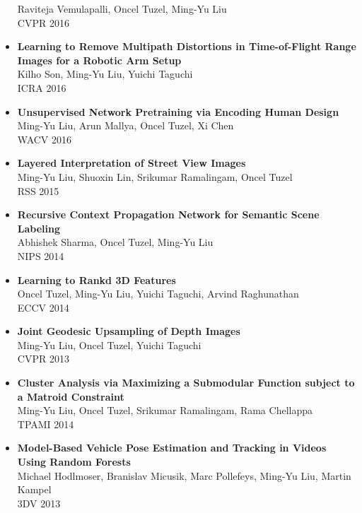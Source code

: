 \begin{itemize}
      Raviteja Vemulapalli, Oncel Tuzel, Ming-Yu Liu\\ CVPR 2016\vspace{-2mm}
\item {\bf Learning to Remove Multipath Distortions in Time-of-Flight Range Images for a Robotic Arm Setup}\\
      Kilho Son, Ming-Yu Liu, Yuichi Taguchi\\
       ICRA 2016\vspace{-2mm}
\item {\bf Unsupervised Network Pretraining via Encoding Human Design}\\
      Ming-Yu Liu, Arun Mallya, Oncel Tuzel, Xi Chen\\ WACV 2016\vspace{-2mm}
\item {\bf Layered Interpretation of Street View Images}\\
      Ming-Yu Liu, Shuoxin Lin, Srikumar Ramalingam, Oncel Tuzel\\
      RSS 2015\vspace{-2mm}
\item {\bf Recursive Context Propagation Network for Semantic Scene Labeling}\\
			Abhishek Sharma, Oncel Tuzel, Ming-Yu Liu\\ NIPS 2014\vspace{-2mm}
\item {\bf Learning to Rankd 3D Features}\\
			Oncel Tuzel, Ming-Yu Liu, Yuichi Taguchi, Arvind Raghunathan\\ ECCV 2014\vspace{-2mm}
\item {\bf Joint Geodesic Upsampling of Depth Images}\\      Ming-Yu Liu, Oncel Tuzel, Yuichi Taguchi\\
CVPR 2013\vspace{-2mm}
\item {\bf Cluster Analysis via Maximizing a Submodular Function subject to a Matroid Constraint}\\
      Ming-Yu Liu, Oncel Tuzel, Srikumar Ramalingam, Rama Chellappa\\ TPAMI 2014\vspace{-2mm}
\item {\bf Model-Based Vehicle Pose Estimation and Tracking in Videos Using Random Forests}\\
      Michael Hodlmoser, Branislav Micusik, Marc Pollefeys, Ming-Yu Liu, Martin Kampel\\ 3DV 2013\vspace{-2mm}

\end{itemize}
